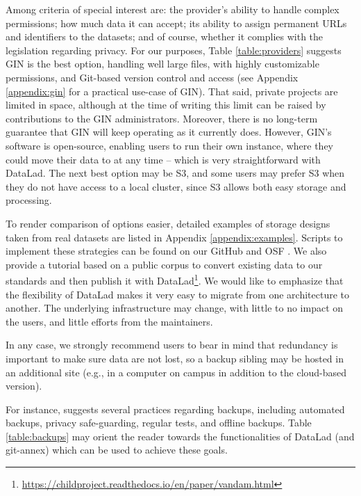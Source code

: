 \documentclass[smallextended]{svjour3}       %
\begin{document}
Among criteria of special interest are: the provider's ability to handle complex permissions; how much data it can accept; its ability to assign permanent URLs and identifiers to the datasets; and of course, whether it complies with the legislation regarding privacy. For our purposes, Table \ref{table:providers} suggests GIN is the best option, handling well large files, with highly customizable permissions, and Git-based version control and access (see Appendix \ref{appendix:gin} for a practical use-case of GIN). That said, private projects are limited in space, although at the time of writing this limit can be raised by contributions to the GIN administrators. Moreover, there is no long-term guarantee that GIN will keep operating as it currently does. However, GIN's software is open-source, enabling users to run their own instance, where they could move their data to at any time -- which is very straightforward with DataLad. The next best option may be S3, and some users may prefer S3 when they do not have access to a local cluster, since S3 allows both easy storage and processing. 

To render comparison of options easier, detailed examples of storage designs taken from real datasets are listed in Appendix \ref{appendix:examples}. Scripts to implement these strategies can be found on our GitHub and OSF \citep{datalad_procedures}. We also provide a tutorial based on a public corpus \citep{vandam-day} to convert existing data to our standards and then publish it with DataLad\footnote{\url{https://childproject.readthedocs.io/en/paper/vandam.html}}.
We would like to emphasize that the flexibility of DataLad makes it very easy to migrate from one architecture to another. The underlying infrastructure may change, with little to no impact on the users, and little efforts from the maintainers.

In any case, we strongly recommend users to bear in mind that redundancy is important to make sure data are not lost, so a backup sibling may be hosted in an additional site (e.g., in a computer on campus in addition to the cloud-based version). 

For instance, \citet{Perkel_2019} suggests several practices regarding backups, including automated backups, privacy safe-guarding, regular tests, and offline backups. Table \ref{table:backups} may orient the reader towards the functionalities of DataLad (and git-annex) which can be used to achieve these goals.
\end{document}
